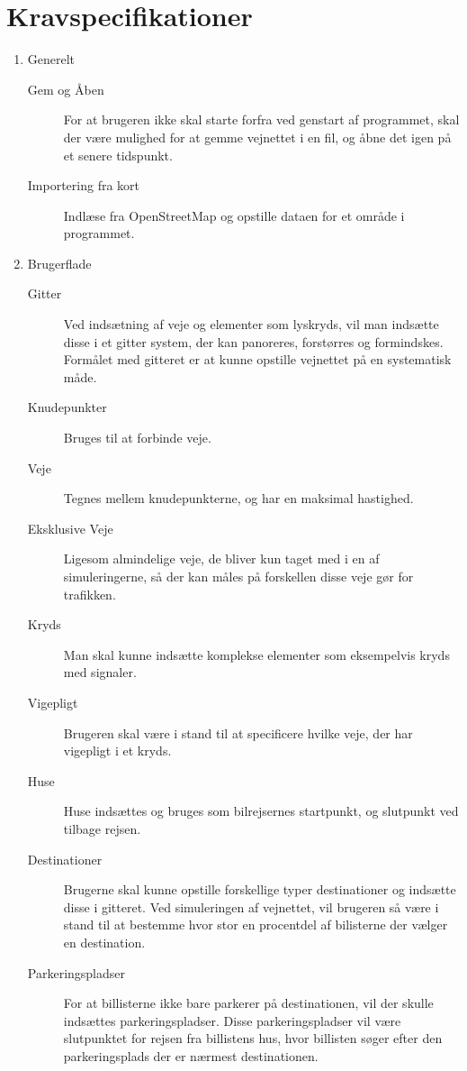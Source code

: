 \chapter{Kravspecifikationer}\label{Kravspecifikationer}

\begin{enumerate}
\item Generelt
	\begin{description}
	\item [Gem og Åben] For at brugeren ikke skal starte forfra ved genstart af programmet, skal der være mulighed for at gemme vejnettet i en fil, og åbne det igen på et senere tidspunkt.
	\item [Importering fra kort] Indlæse fra OpenStreetMap og opstille dataen for et område i programmet.
	\end{description}
\item Brugerflade
	\begin{description}
	\item [Gitter] Ved indsætning af veje og elementer som lyskryds, vil man indsætte disse i et gitter system, der kan panoreres, forstørres og formindskes. Formålet med gitteret er at kunne opstille vejnettet på en systematisk måde.
	\item [Knudepunkter] Bruges til at forbinde veje.
	\item [Veje] Tegnes mellem knudepunkterne, og har en maksimal hastighed.
	\item [Eksklusive Veje] Ligesom almindelige veje, de bliver kun taget med i en af simuleringerne, så der kan måles på forskellen disse veje gør for trafikken.
	\item [Kryds] Man skal kunne indsætte komplekse elementer som eksempelvis kryds med signaler.
	\item [Vigepligt] Brugeren skal være i stand til at specificere hvilke veje, der har vigepligt i et kryds.
	\item [Huse] Huse indsættes og bruges som bilrejsernes startpunkt, og slutpunkt ved tilbage rejsen.
	\item [Destinationer] Brugerne skal kunne opstille forskellige typer destinationer og indsætte disse i gitteret. Ved simuleringen af vejnettet, vil brugeren så være i stand til at bestemme hvor stor en procentdel af bilisterne der vælger en destination.
	\item [Parkeringspladser] For at billisterne ikke bare parkerer på destinationen, vil der skulle indsættes parkeringspladser. Disse parkeringspladser vil være slutpunktet for rejsen fra billistens hus, hvor billisten søger efter den parkeringsplads der er nærmest destinationen.

\end{description}
\end{enumerate}
